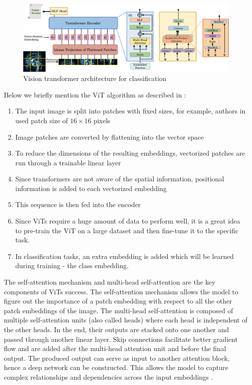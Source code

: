 \begin{figure}[H]
    \begin{centering}
    \includegraphics[width=14cm]{assets/images/vit.jpg}
    \par\end{centering}
    \caption{Vision transformer architecture for classification \cite{Shamshad2023}}
    \label{fig:vit}
\end{figure}

Below we briefly mention the ViT algorithm as described in \cite{Shamshad2023}:

\begin{enumerate}
    \item The input image is split into patches with fixed sizes, for example, authors in \cite{Dosovitskiy2020} used patch size of $16\!\times\!16$ pixels
    \item Image patches are converted by flattening into the vector space
    \item To reduce the dimensions of the resulting embeddings, vectorized patches are run through a trainable linear layer
    \item Since transformers are not aware of the spatial information, positional information is added to each vectorized embedding
    \item This sequence is then fed into the encoder
    \item Since ViTs require a huge amount of data to perform well, it is a great idea to pre-train the ViT on a large dataset and then fine-tune it to the specific task.
    \item In classification tasks, an extra embedding is added which will be learned during training - the class embedding.
\end{enumerate}

The self-attention mechanism and multi-head self-attention are the key components of ViTs success. The self-attention mechanism allows the model to figure out the importance of a patch embedding with respect to all the other patch embeddings of the image. The multi-head self-attention is composed of multiple self-attention units (also called heads) where each head is independent of the other heads. In the end, their outputs are stacked onto one another and passed through another linear layer. Skip connections facilitate better gradient flow and are added after the multi-head attention unit and before the final output. The produced output can serve as input to another attention block, hence a deep network can be constructed. This allows the model to capture complex relationships and dependencies across the input embeddings \cite{Shamshad2023}.

